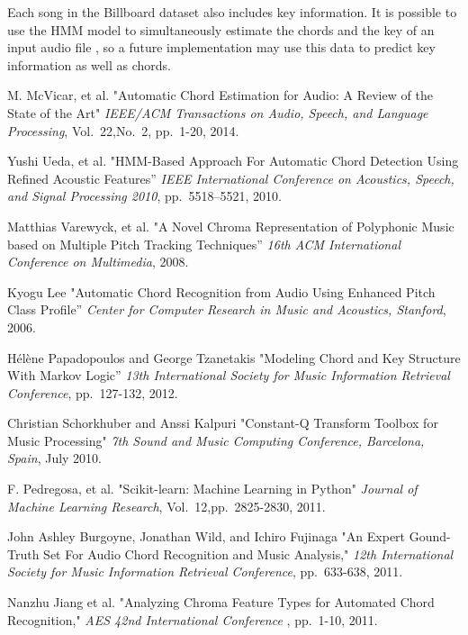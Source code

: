 \documentclass{article}
\begin{document}
Each song in the Billboard dataset also includes key information. It is possible to use the HMM model to
simultaneously estimate the chords and the key of an input audio file \cite{McVicar:00}, so a future
implementation may use this data to predict key information as well as chords.

\begin{thebibliography}{citations}

M. McVicar, et al.
"Automatic Chord Estimation for Audio: A Review of the State of the Art"
{\it IEEE/ACM Transactions on Audio, Speech, and Language Processing},
Vol.~22,No.~2, pp.~1-20, 2014.

Yushi Ueda, et al.
"HMM-Based Approach For Automatic Chord Detection Using Refined Acoustic Features''
{\it IEEE International Conference on Acoustics, Speech, and Signal Processing 2010},
pp.~5518--5521, 2010.

Matthias Varewyck, et al.
"A Novel Chroma Representation of Polyphonic Music based on Multiple Pitch
Tracking Techniques''
{\it 16th ACM International Conference on Multimedia},
2008.

Kyogu Lee
"Automatic Chord Recognition from Audio Using Enhanced Pitch Class Profile''
{\it Center for Computer Research in Music and Acoustics, Stanford},
2006.

Hélène Papadopoulos and George Tzanetakis
"Modeling Chord and Key Structure With Markov Logic''
{\it 13th International Society for Music Information Retrieval Conference},
pp.~127-132, 2012.

Christian Schorkhuber and Anssi Kalpuri
"Constant-Q Transform Toolbox for Music Processing"
{\it 7th Sound and Music Computing Conference, Barcelona, Spain},
July 2010.

F. Pedregosa, et al.
"Scikit-learn: Machine Learning in Python"
{\it Journal of Machine Learning Research},
Vol.~12,pp.~2825-2830, 2011.

John Ashley Burgoyne, Jonathan Wild, and Ichiro Fujinaga
"An Expert Gound-Truth Set For Audio Chord Recognition and Music Analysis,"
{\it 12th International Society for Music Information Retrieval Conference},
pp.~633-638, 2011.

Nanzhu Jiang et al.
"Analyzing Chroma Feature Types for Automated Chord Recognition,"
{\it AES 42nd International Conference },
pp.~1-10, 2011.


\end{thebibliography}
\end{document}
